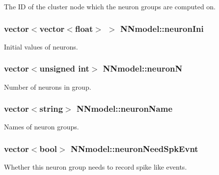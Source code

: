 The I\+D of the cluster node which the neuron groups are computed on. 

\hypertarget{classNNmodel_a04c2e61ef297c1e0fd3f0acb32f79a17}{
\subsubsection[{neuron\+Ini}]{\setlength{\rightskip}{0pt plus 5cm}vector$<$vector$<$float$>$ $>$ N\+Nmodel\+::neuron\+Ini}}\label{classNNmodel_a04c2e61ef297c1e0fd3f0acb32f79a17}


Initial values of neurons. 

\hypertarget{classNNmodel_a87d3de14d0d5c7183199fea48c04b949}{
\subsubsection[{neuron\+N}]{\setlength{\rightskip}{0pt plus 5cm}vector$<$unsigned int$>$ N\+Nmodel\+::neuron\+N}}\label{classNNmodel_a87d3de14d0d5c7183199fea48c04b949}


Number of neurons in group. 

\hypertarget{classNNmodel_af3c7ec6917040e62be5cee3505c330a8}{
\subsubsection[{neuron\+Name}]{\setlength{\rightskip}{0pt plus 5cm}vector$<$string$>$ N\+Nmodel\+::neuron\+Name}}\label{classNNmodel_af3c7ec6917040e62be5cee3505c330a8}


Names of neuron groups. 

\hypertarget{classNNmodel_abd22d449a48437fbf4e090b553f471f8}{
\subsubsection[{neuron\+Need\+Spk\+Evnt}]{\setlength{\rightskip}{0pt plus 5cm}vector$<$bool$>$ N\+Nmodel\+::neuron\+Need\+Spk\+Evnt}}\label{classNNmodel_abd22d449a48437fbf4e090b553f471f8}


Whether this neuron group needs to record spike like events. 

